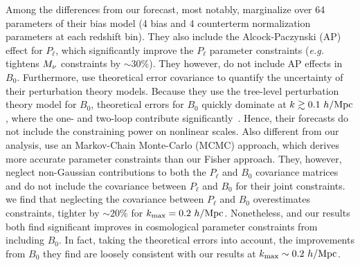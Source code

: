 Among the differences from our forecast, most notably, \cite{chudaykin2019}  
marginalize over 64 parameters of their bias model (4 bias and 4 counterterm 
normalization parameters at each redshift bin). They also include the 
Alcock-Paczynski (AP) effect for $P_\ell$, which significantly improve the 
$P_\ell$ parameter constraints (\emph{e.g.} tightens $M_\nu$ constraints by $\sim30\%$). 
They however, do not include AP effects in $B_0$. Furthermore, 
\cite{chudaykin2019} use theoretical error covariance to quantify the 
uncertainty of their perturbation theory models. Because they use the tree-level 
perturbation theory model for $B_0$, theoretical errors for $B_0$ quickly 
dominate at $k \gtrsim 0.1~h/{\rm Mpc}$, where the one- and two-loop contribute 
significantly~\citep[\emph{e.g.}][]{lazanu2018}. Hence, their forecasts do not include 
the constraining power on nonlinear scales. Also different from our analysis,
\cite{chudaykin2019} use an Markov-Chain Monte-Carlo (MCMC) 
approach, which derives more accurate parameter constraints than our Fisher
approach. They, however, neglect non-Gaussian contributions to both the 
$P_\ell$ and $B_0$ covariance matrices and do not include the covariance 
between $P_\ell$ and $B_0$ for their joint constraints. 
we find that neglecting the covariance between $P_\ell$ and $B_0$ overestimates 
constraints, tighter by ${\sim}20\%$ for $k_{\rm max} = 0.2~h/{\rm Mpc}$. 
Nonetheless, \cite{chudaykin2019} 
and our results both find significant improves in cosmological parameter 
constraints from including $B_0$. In fact, taking the theoretical errors 
into account, the improvements from $B_0$ they find are loosely consistent 
with our results at $k_{\rm max} \sim  0.2~h/{\rm Mpc}$. 

